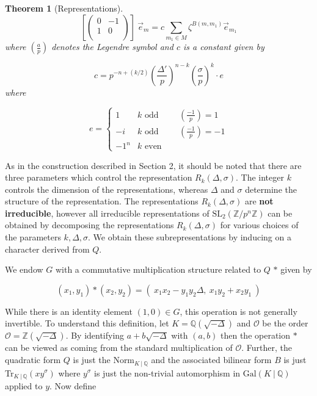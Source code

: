 \documentclass[12pt,reqno]{amsart}
\newtheorem{theorem}{Theorem}[section]
\theoremstyle{remark}
\numberwithin{table}{section}
\newcommand{\Q}{\mathbb Q}
\newcommand{\Z}{\mathbb Z}
\newcommand{\slpn}{\text{SL}_2(\Z/p^n \Z)}
\begin{document}
\begin{theorem}[Representations]
\begin{equation}\label{eq:w} \left[ \left(
\begin{array}{cc}
0 & -1 \\
1 & 0 \\
\end{array} \right) \right ] \: \vec{e}_{m} =  c \displaystyle \sum_{m_1 \in M} \zeta^{B(m,m_1)}  \vec{e}_{m_1}  \end{equation}
where $\left ( \frac{a}{p} \right )$ denotes the Legendre symbol and $c$ is a constant 
given by 


\[ c = p^{-n +(k/2)} \left ( \frac{\Delta'}{p} \right )^{n -k} \left ( \frac{\sigma}{p} \right )^{k} \cdot e \]
where 

\[e = 
\begin{cases} 1 & k \text{ odd} \hspace{1cm} \left ( \frac{-1}{p} \right ) = 1 \\
-i & k \text{ odd} \hspace{1cm} \left ( \frac{-1}{p} \right ) = -1 \\
-1^n & k  \text{ even} \end{cases}  \]

\end{theorem}


As in the construction described in Section 2, it should be noted that there are three parameters which control the representation $R_k(\Delta, \sigma)$. The integer $k$ controls the dimension of the representations, whereas $\Delta$ and $\sigma$ determine the structure of the representation.  The representations $R_k(\Delta, \sigma)$ are \textbf{not irreducible}, however all irreducible representations of $\slpn$ can be obtained by decomposing the representations $R_k(\Delta, \sigma)$ for various choices of the parameters $k, \Delta, \sigma$. We obtain these subrepresentations by inducing on a character derived from $Q$.

 We endow $G$ with a commutative multiplication structure related to $Q$ $*$ given by 

\[ (x_1,y_1) * (x_2,y_2)  = ( \: x_1x_2 - y_1y_2 \Delta,  \:  x_1y_2 + x_2y_1 \: ) \]

\vspace{.2cm}

While there is an identity element $(1,0) \in G$, this operation is not generally invertible. To understand this definition, let $K = \Q(\sqrt{-\Delta})$ and $\mathcal{O}$ be the order $\mathcal{O} = \Z(\sqrt{-\Delta})$. By identifying $a + b\sqrt{-\Delta}$ with $(a,b)$ then the operation $*$ can be viewed as coming from the standard multiplication of $\mathcal{O}$. Further, the quadratic form $Q$ is just the Norm$_{K\: |\: \Q}$ and the associated bilinear form $B$ is just Tr$_{K\: |\: \Q}(xy^\sigma)$ where $y^\sigma$ is just the non-trivial automorphism in $\text{Gal}( K\: |\: \Q)$ applied to $y$.   Now define
\end{document}
